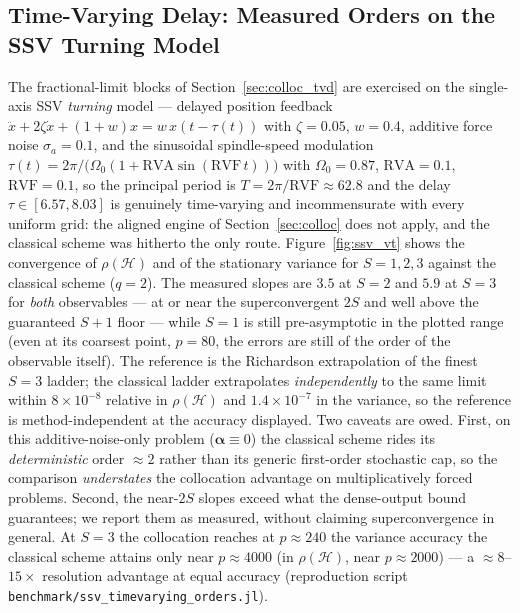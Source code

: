 \documentclass[preprint,12pt]{elsarticle}
\begin{document}
\subsection{Time-Varying Delay: Measured Orders on the SSV Turning Model}
\label{sec:results_tvd}
The fractional-limit blocks of Section~\ref{sec:colloc_tvd} are exercised on the single-axis SSV \emph{turning} model --- delayed position feedback $\ddot{x} + 2\zeta\dot{x} + (1{+}w)x = w\,x(t-\tau(t))$ with $\zeta = 0.05$, $w = 0.4$, additive force noise $\sigma_a = 0.1$, and the sinusoidal spindle-speed modulation $\tau(t) = 2\pi/\big(\Omega_0(1 + \mathrm{RVA}\sin(\mathrm{RVF}\,t))\big)$ with $\Omega_0 = 0.87$, $\mathrm{RVA} = 0.1$, $\mathrm{RVF} = 0.1$, so the principal period is $T = 2\pi/\mathrm{RVF} \approx 62.8$ and the delay $\tau \in [6.57, 8.03]$ is genuinely time-varying and incommensurate with every uniform grid: the aligned engine of Section~\ref{sec:colloc} does not apply, and the classical scheme was hitherto the only route. Figure~\ref{fig:ssv_vt} shows the convergence of $\rho(\mathcal{H})$ and of the stationary variance for $S = 1, 2, 3$ against the classical scheme ($q=2$). The measured slopes are $3.5$ at $S{=}2$ and $5.9$ at $S{=}3$ for \emph{both} observables --- at or near the superconvergent $2S$ and well above the guaranteed $S{+}1$ floor --- while $S{=}1$ is still pre-asymptotic in the plotted range (even at its coarsest point, $p=80$, the errors are still of the order of the observable itself). The reference is the Richardson extrapolation of the finest $S{=}3$ ladder; the classical ladder extrapolates \emph{independently} to the same limit within $8\times 10^{-8}$ relative in $\rho(\mathcal{H})$ and $1.4\times 10^{-7}$ in the variance, so the reference is method-independent at the accuracy displayed. Two caveats are owed. First, on this additive-noise-only problem ($\boldsymbol\alpha \equiv 0$) the classical scheme rides its \emph{deterministic} order $\approx 2$ rather than its generic first-order stochastic cap, so the comparison \emph{understates} the collocation advantage on multiplicatively forced problems. Second, the near-$2S$ slopes exceed what the dense-output bound guarantees; we report them as measured, without claiming superconvergence in general. At $S{=}3$ the collocation reaches at $p \approx 240$ the variance accuracy the classical scheme attains only near $p \approx 4000$ (in $\rho(\mathcal{H})$, near $p \approx 2000$) --- a ${\approx}8$--$15\times$ resolution advantage at equal accuracy (reproduction script \texttt{benchmark/ssv\_timevarying\_orders.jl}).
\end{document}

